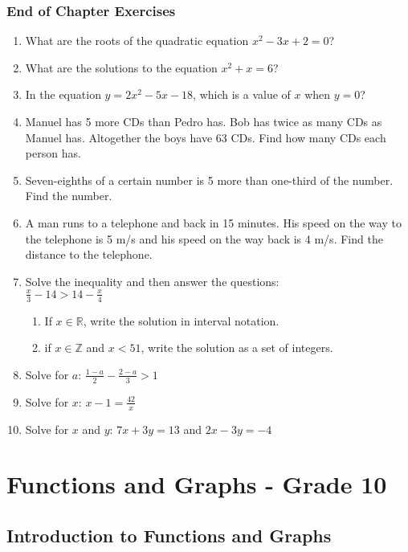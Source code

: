 \documentclass[10pt,a4paper,titlepage,twoside,openright]{report}
\begin{document}
\subsection{End of Chapter Exercises}
\begin{enumerate}
\item{What are the roots of the quadratic equation $x^2-3x+2 = 0$?}
\item{What are the solutions to the equation $x^2+x = 6$?}
\item{In the equation $y = 2x^2- 5x-18$, which is a value of $x$ when $y = 0$?}
\item{Manuel has 5 more CDs than Pedro has. Bob has twice as many CDs as Manuel has. Altogether the boys have 63 CDs. Find how many CDs each person has.}
\item{Seven-eighths of a certain number is 5 more than one-third of the number.  Find the number.}
\item{A man runs to a telephone and back in 15 minutes.  His speed on the way to the telephone is 5 m/s and his speed on the way back is 4 m/s.  Find the distance to the telephone.}
\item{Solve the inequality and then answer the questions: \\  
$\frac{x}{3}- 14 > 14 -\frac{x}{4}$}
\begin{enumerate}
\item{If $x \in \mathbb{R}$, write the solution in interval notation.}
\item{if $x \in \mathbb{Z}$  and $x<51$, write the solution as a set of integers.}
\end{enumerate}
\item{Solve for $a$:  $\frac{1-a}{2}- \frac{2-a}{3}> 1$}
\item{Solve for $x$:  $ x-1 = \frac{42}{x}$}
\item{Solve for $x$ and $y$:  $7x + 3y = 13$  and $ 2x - 3y = -4$}
\end{enumerate}





\chapter{Functions and Graphs - Grade 10}
\label{m:fg10}

\section{Introduction to Functions and Graphs}
\label{m:fg10:i}
\end{document}

